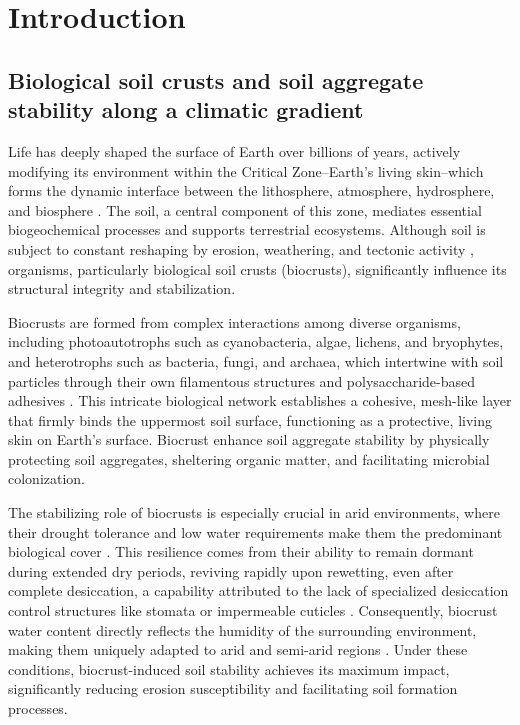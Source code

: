 \chapter{Introduction}
\section{Biological soil crusts and soil aggregate stability along a climatic gradient}
\label{sec:BiocrustAndStabilityInCLimate}

Life has deeply shaped the surface of Earth over billions of years, actively modifying its environment within the Critical Zone--Earth's living skin--which forms the dynamic interface between the lithosphere, atmosphere, hydrosphere, and biosphere \citep{Amundson2007,Brantley2017,Dietrich2006}. The soil, a central component of this zone, mediates essential biogeochemical processes and supports terrestrial ecosystems. Although soil is subject to constant reshaping by erosion, weathering, and tectonic activity \citep{Scholten2017}, organisms, particularly biological soil crusts (biocrusts), significantly influence its structural integrity and stabilization.

Biocrusts are formed from complex interactions among diverse organisms, including photoautotrophs such as cyanobacteria, algae, lichens, and bryophytes, and heterotrophs such as bacteria, fungi, and archaea, which intertwine with soil particles through their own filamentous structures and polysaccharide-based adhesives \citep{Belnap2016,Gao2017,Weber2022,Xiao2022}. This intricate biological network establishes a cohesive, mesh-like layer that firmly binds the uppermost soil surface, functioning as a protective, living skin on Earth's surface. Biocrust enhance soil aggregate stability by physically protecting soil aggregates, sheltering organic matter, and facilitating microbial colonization.

The stabilizing role of biocrusts is especially crucial in arid environments, where their drought tolerance and low water requirements make them the predominant biological cover \citep{Chen2020,Oliver2005}. This resilience comes from their ability to remain dormant during extended dry periods, reviving rapidly upon rewetting, even after complete desiccation, a capability attributed to the lack of specialized desiccation control structures like stomata or impermeable cuticles \citep{Maegdefrau1951,Proctor2007,Thielen2021}. Consequently, biocrust water content directly reflects the humidity of the surrounding environment, making them uniquely adapted to arid and semi-arid regions \citep{Colesie2016, Grote2010}. Under these conditions, biocrust-induced soil stability achieves its maximum impact, significantly reducing erosion susceptibility and facilitating soil formation processes.

